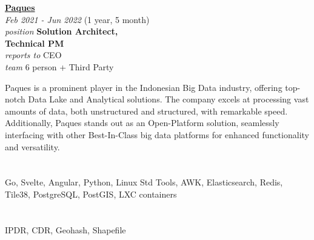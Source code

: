 \documentclass[12pt]{res} %
\begin{document}
\begin{resume}
\vspace{16pt} %
\begin{minipage}[t]{6.5cm}
\begin{flushleft}
	{\large {\bf \href{https://paques.id}{Paques}}} \\
	{\footnotesize{\sl Feb 2021 - Jun 2022} \hfill (1 year, 5 month)}\\
	{\footnotesize{\sl position} \hfill \bf{Solution Architect,\\ \hfill Technical PM}}\\
	{\footnotesize{\sl reports to} \hfill CEO}\\
	{\footnotesize{\sl team} \hfill 6 person + Third Party}\\
\end{flushleft}
\end{minipage}
\hspace{0.5cm}
\begin{minipage}[t]{0.56\linewidth}
	Paques is a prominent player in the Indonesian Big Data industry, offering top-notch Data Lake and Analytical solutions. The company excels at processing vast amounts of data, both unstructured and structured, with remarkable speed. Additionally, Paques stands out as an Open-Platform solution, seamlessly interfacing with other Best-In-Class big data platforms for enhanced functionality and versatility.
\end{minipage}

\begin{multicols}{2}
	\section{}
	Go, Svelte, Angular, Python, Linux Std Tools, AWK, Elasticsearch, Redis, Tile38, PostgreSQL, PostGIS, LXC containers
	\section{}
	IPDR, CDR, Geohash, Shapefile
\end{multicols}


\end{resume}
\end{document}
